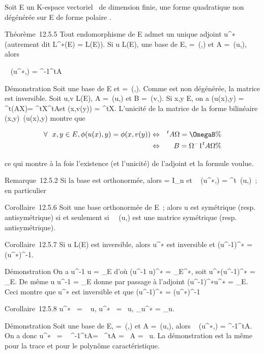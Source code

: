 \documentclass[]{article}
\begin{document}
Soit E un K-espace vectoriel ~de dimension finie, \Phi une forme
quadratique non dégénérée sur E de forme polaire \phi.

Théorème~12.5.5 Tout endomorphisme de E admet un unique adjoint
u^∗ (autrement dit L^∗(E) = L(E)). Si u \in L(E), 
une base de E, \Omega =\
\mathrmMat (\phi,) et A =\
\mathrmMat (u,), alors

\mathrmMat~
(u^∗,) = \Omega^-1^tA\Omega

Démonstration Soit \mathcal{E} une base de E et \Omega =\
\mathrmMat (\phi,). Comme \phi est non dégénérée, la
matrice \Omega est inversible. Soit u,v \in L(E), A =\
\mathrmMat (u,) et B =\
\mathrmMat (v,). Si x,y \in E, on a \phi(u(x),y) =
^t(AX)\OmegaY = ^tX^tA\OmegaY et \phi(x,v(y)) =
^tX\OmegaBY . L'unicité de la matrice de la forme bilinéaire
(x,y)\mapsto~\phi(u(x),y) montre que

\begin{align*} \forall~~x,y \in E,
\phi(u(x),y) = \phi(x,v(y))& \Leftrightarrow & ^tA\Omega
= \OmegaB \%& \\ &
\Leftrightarrow & B = \Omega^-1^tA\Omega\%&
\\ \end{align*}

ce qui montre à la fois l'existence (et l'unicité) de l'adjoint et la
formule voulue.

Remarque~12.5.2 Si la base  est orthonormée, alors \Omega = I_n et
\mathrmMat~
(u^∗,) = ^t\
\mathrmMat (u,)~; en particulier

Corollaire~12.5.6 Soit \mathcal{E} une base orthonormée de E~; alors u est
symétrique (resp. antisymétrique) si et seulement
si~\mathrmMat~ (u,\mathcal{E}) est une
matrice symétrique (resp. antisymétrique).

Corollaire~12.5.7 Si u \in L(E) est inversible, alors u^∗ est
inversible et (u^-1)^∗ =
(u^∗)^-1.

Démonstration On a u^-1 \cdot u =
\mathrmId_E d'où (u^-1 \cdot
u)^∗ = \mathrmId_E^∗, soit
u^∗\cdot (u^-1)^∗ =
\mathrmId_E. De même u \cdot u^-1 =
\mathrmId_E donne par passage à l'adjoint
(u^-1)^∗\cdot u^∗ =
\mathrmId_E. Ceci montre que u^∗
est inversible et que (u^-1)^∗ =
(u^∗)^-1

Corollaire~12.5.8
\mathrm{det} u^∗~
= ~ u,
u^∗~
= \mathrm{tr}~u,
\chi_u^∗ = \chi_u.

Démonstration Soit  une base de E, \Omega =\
\mathrmMat (\phi,) et A =\
\mathrmMat (u,), alors
\mathrmMat~
(u^∗,\mathcal{E}) = \Omega^-1^tA\Omega. On a donc
\mathrm{det} u^∗~
= \mathrm{det}~
\Omega^-1^tA\Omega =\
 ^tA =\
 A =\
 u. La démonstration est la même pour la
trace et pour le polynôme caractéristique.
\end{document}
